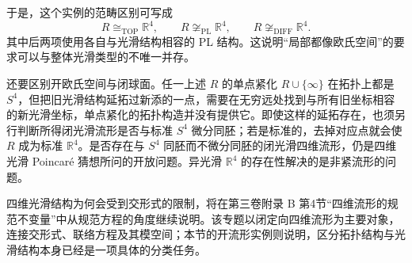 于是，这个实例的范畴区别可写成
\[
	R\cong_{\mathrm{TOP}}\mathbb R^4,
	\qquad R\not\cong_{\mathrm{PL}}\mathbb R^4,
	\qquad R\not\cong_{\mathrm{DIFF}}\mathbb R^4.
\]
其中后两项使用各自与光滑结构相容的 PL 结构。这说明“局部都像欧氏空间”的要求可以与整体光滑类型的不唯一并存。

\ProseParagraphBreak

还要区别开欧氏空间与闭球面。任一上述 \(R\) 的单点紧化 \(R\cup\{\infty\}\) 在拓扑上都是 \(S^4\)，但把旧光滑结构延拓过新添的一点，需要在无穷远处找到与所有旧坐标相容的新光滑坐标，单点紧化的拓扑构造并没有提供它。即使这样的延拓存在，也须另行判断所得闭光滑流形是否与标准 \(S^4\) 微分同胚；若是标准的，去掉对应点就会使 \(R\) 成为标准 \(\mathbb R^4\)。是否存在与 \(S^4\) 同胚而不微分同胚的闭光滑四维流形，仍是四维光滑 Poincar\'e 猜想所问的开放问题。异光滑 \(\mathbb R^4\) 的存在性解决的是非紧流形的问题。

\ProseParagraphBreak

四维光滑结构为何会受到交形式的限制，将在第三卷附录 B 第4节“四维流形的规范不变量”中从规范方程的角度继续说明。该专题以闭定向四维流形为主要对象，连接交形式、联络方程及其模空间；本节的开流形实例则说明，区分拓扑结构与光滑结构本身已经是一项具体的分类任务。
